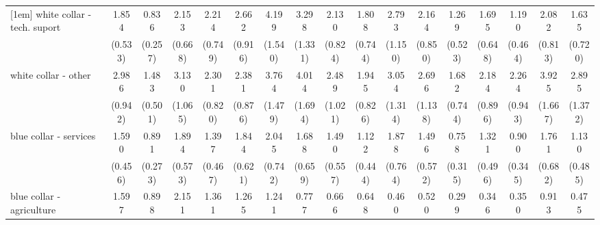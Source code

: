 {\begin{tabular}{l*{16}{c}}
[1em]
white collar - tech. suport&       1.854\sym{*}  &       0.836         &       2.153\sym{*}  &       2.214\sym{*}  &       2.662\sym{**} &       4.199\sym{***}&       3.298\sym{**} &       2.130         &       1.808         &       2.793\sym{*}  &       2.164\sym{*}  &       1.269         &       1.695         &       1.190         &       2.082         &       1.635         \\
                    &     (0.533)         &     (0.257)         &     (0.668)         &     (0.749)         &     (0.916)         &     (1.540)         &     (1.331)         &     (0.824)         &     (0.744)         &     (1.150)         &     (0.850)         &     (0.523)         &     (0.648)         &     (0.464)         &     (0.813)         &     (0.720)         \\
[1em]
white collar - other&       2.986\sym{***}&       1.483         &       3.130\sym{***}&       2.301\sym{*}  &       2.381\sym{*}  &       3.764\sym{***}&       4.014\sym{***}&       2.489\sym{*}  &       1.945         &       3.054\sym{**} &       2.696\sym{*}  &       1.682         &       2.184         &       2.264\sym{*}  &       3.925\sym{**} &       2.895\sym{*}  \\
                    &     (0.942)         &     (0.501)         &     (1.065)         &     (0.820)         &     (0.876)         &     (1.479)         &     (1.694)         &     (1.021)         &     (0.826)         &     (1.314)         &     (1.138)         &     (0.744)         &     (0.896)         &     (0.943)         &     (1.667)         &     (1.372)         \\
[1em]
blue collar - services&       1.590         &       0.891         &       1.894\sym{*}  &       1.397         &       1.844         &       2.045\sym{*}  &       1.688         &       1.490         &       1.122         &       1.878         &       1.496         &       0.758         &       1.321         &       0.900         &       1.761         &       1.130         \\
                    &     (0.456)         &     (0.273)         &     (0.573)         &     (0.467)         &     (0.621)         &     (0.742)         &     (0.659)         &     (0.557)         &     (0.444)         &     (0.764)         &     (0.572)         &     (0.315)         &     (0.496)         &     (0.345)         &     (0.682)         &     (0.485)         \\
[1em]
blue collar - agriculture&       1.597         &       0.898         &       2.151         &       1.361         &       1.265         &       1.241         &       0.777         &       0.666         &       0.648         &       0.460         &       0.520         &       0.299\sym{*}  &       0.346\sym{*}  &       0.350\sym{*}  &       0.913         &       0.475         \\

\end{tabular}}
